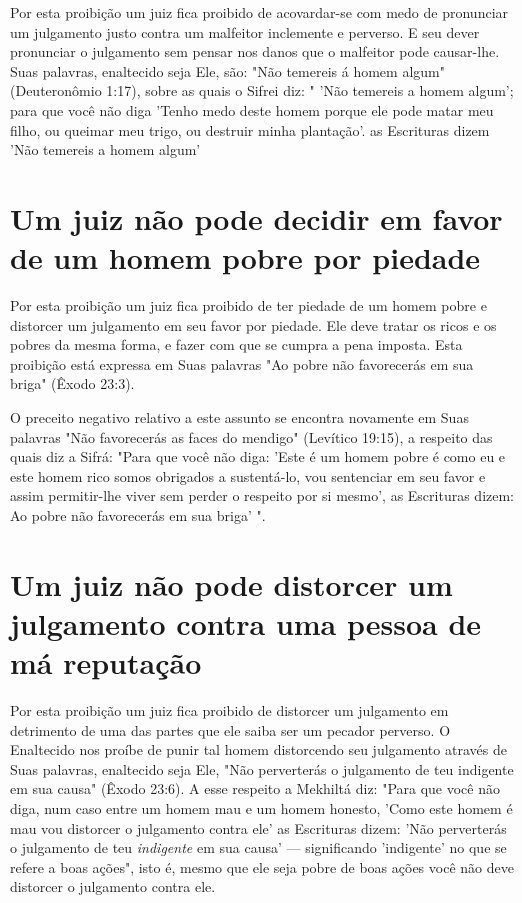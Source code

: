 \begin{itemize}
\begin{enumrate}
\begin{itemize}
\begin{itemize}
\begin{itemize}
Por esta proibição um juiz fica proibido de acovardar-se com medo de
pronunciar um julgamento justo contra um malfeitor inclemente e
perver­so. E seu dever pronunciar o julgamento sem pensar nos danos que
o malfeitor pode causar-lhe. Suas palavras, enaltecido seja Ele, são:
"Não temereis á homem algum" (Deuteronômio 1:17), sobre as quais o
Sifrei diz: " 'Não temereis a ho­mem algum'; para que você não diga
'Tenho medo deste homem porque ele pode matar meu filho, ou queimar meu
trigo, ou destruir minha plantação'. as Escrituras dizem 'Não temereis a
homem algum'

\section{Um juiz não pode decidir em favor de um homem pobre por piedade}

Por esta proibição um juiz fica proibido de ter piedade de um ho­mem
pobre e distorcer um julgamento em seu favor por piedade. Ele deve
tra­tar os ricos e os pobres da mesma forma, e fazer com que se cumpra a
pena imposta. Esta proibição está expressa em Suas palavras "Ao pobre
não favore­cerás em sua briga" (Êxodo 23:3).

O preceito negativo relativo a este assunto se encontra novamente em
Suas palavras "Não favorecerás as faces do mendigo" (Levítico 19:15), a
res­peito das quais diz a Sifrá: "Para que você não diga: 'Este é um
homem pobre é como eu e este homem rico somos obrigados a sustentá-lo,
vou sentenciar em seu favor e assim permitir-lhe viver sem perder o
respeito por si mesmo', as Escrituras dizem: Ao pobre não favorecerás em
sua briga' ".

\section{Um juiz não pode distorcer um julgamento contra uma pessoa de má reputação}

Por esta proibição um juiz fica proibido de distorcer um julgamento em
detrimento de uma das partes que ele saiba ser um pecador perverso. O
Enaltecido nos proíbe de punir tal homem distorcendo seu julgamento
através de Suas palavras, enaltecido seja Ele, "Não perverterás o
julgamento de teu in­digente em sua causa" (Êxodo 23:6). A esse respeito
a Mekhiltá diz: "Para que você não diga, num caso entre um homem mau e
um homem honesto, 'Como este homem é mau vou distorcer o julgamento
contra ele' as Escrituras dizem: 'Não perverterás o julgamento de teu
\emph{indigente} em sua causa' --- significando 'indigente' no que se
refere a boas ações", isto é, mesmo que ele seja pobre de boas ações
você não deve distorcer o julgamento contra ele.


\end{itemize}
\end{itemize}
\end{itemize}
\end{enumrate}
\end{itemize}

